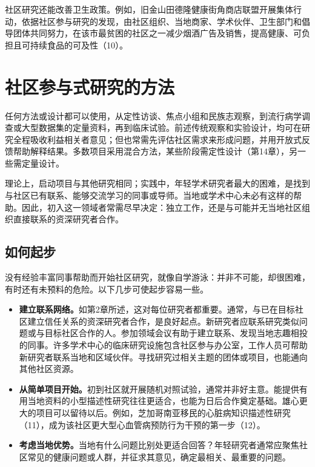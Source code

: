 社区研究还能改善卫生政策。例如，旧金山田德隆健康街角商店联盟开展集体行动，依据社区参与研究的发现，由社区组织、当地商家、学术伙伴、卫生部门和倡导团体共同努力，在该市最贫困的社区之一减少烟酒广告及销售，提高健康、可负担且可持续食品的可及性（10）。

\section{社区参与式研究的方法}
任何方法或设计都可以使用，从定性访谈、焦点小组和民族志观察，到流行病学调查或大型数据集的定量资料，再到临床试验。前述传统观察和实验设计，均可在研究全程吸收利益相关者意见；但也常需先评估社区需求来形成问题，并用开放式反馈帮助解释结果。多数项目采用混合方法，某些阶段需定性设计（第14章），另一些需定量设计。

理论上，启动项目与其他研究相同；实践中，年轻学术研究者最大的困难，是找到与社区已有联系、能够交流学习的同事或导师。当地或学术中心未必有这样的帮助。因此，初入这一领域者常需尽早决定：独立工作，还是与可能并无当地社区组织直接联系的资深研究者合作。
\subsection{如何起步}
没有经验丰富同事帮助而开始社区研究，就像自学游泳：并非不可能，却很困难，有时还有未预料的危险。以下几步可使起步容易一些。
\begin{itemize}
\item \textbf{建立联系网络。}如第2章所述，这对每位研究者都重要。通常，与已在目标社区建立信任关系的资深研究者合作，是良好起点。新研究者应联系研究类似问题或与目标社区合作的人。参加领域会议有助于建立联系、发现当地志趣相投的同事。许多学术中心的临床研究设施包含社区参与办公室，工作人员可帮助新研究者联系当地和区域伙伴。寻找研究过相关主题的团体或项目，也能通向其他社区资源。
\item \textbf{从简单项目开始。}初到社区就开展随机对照试验，通常并非好主意。能提供有用当地资料的小型描述性研究往往更适合，也能为日后合作奠定基础。雄心更大的项目可以留待以后。例如，芝加哥南亚移民的心脏病知识描述性研究（11），成为该社区更大型心血管病预防行为干预的第一步（12）。
\item \textbf{考虑当地优势。}当地有什么问题比别处更适合回答？年轻研究者通常应聚焦社区常见的健康问题或人群，并征求其意见，确定最相关、最重要的问题。
\end{itemize}

